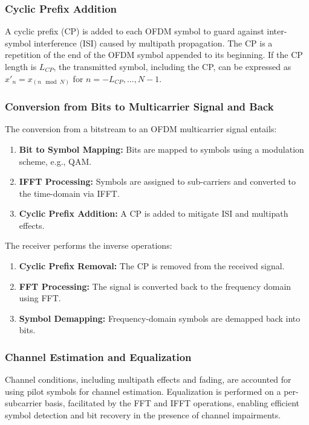 \documentclass{article}
\begin{document}
\subsubsection*{Cyclic Prefix Addition}
A cyclic prefix (CP) is added to each OFDM symbol to guard against inter-symbol interference (ISI) caused by multipath propagation. The CP is a repetition of the end of the OFDM symbol appended to its beginning. If the CP length is \(L_{CP}\), the transmitted symbol, including the CP, can be expressed as \(x'_n = x_{(n \mod N)}\) for \(n = -L_{CP}, ..., N-1\).

\subsubsection*{Conversion from Bits to Multicarrier Signal and Back}
The conversion from a bitstream to an OFDM multicarrier signal entails:
\begin{enumerate}
    \item \textbf{Bit to Symbol Mapping:} Bits are mapped to symbols using a modulation scheme, e.g., QAM.
    \item \textbf{IFFT Processing:} Symbols are assigned to sub-carriers and converted to the time-domain via IFFT.
    \item \textbf{Cyclic Prefix Addition:} A CP is added to mitigate ISI and multipath effects.
\end{enumerate}

The receiver performs the inverse operations:
\begin{enumerate}
    \item \textbf{Cyclic Prefix Removal:} The CP is removed from the received signal.
    \item \textbf{FFT Processing:} The signal is converted back to the frequency domain using FFT.
    \item \textbf{Symbol Demapping:} Frequency-domain symbols are demapped back into bits.
\end{enumerate}

\subsubsection*{Channel Estimation and Equalization}
Channel conditions, including multipath effects and fading, are accounted for using pilot symbols for channel estimation. Equalization is performed on a per-subcarrier basis, facilitated by the FFT and IFFT operations, enabling efficient symbol detection and bit recovery in the presence of channel impairments.
\end{document}
